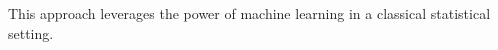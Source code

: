 \documentclass[11pt, oneside]{article}   	%
\begin{document}
This approach leverages the power of machine learning in a classical statistical setting.

%
%
\end{document}

